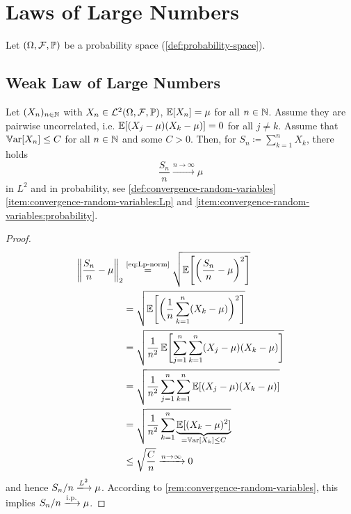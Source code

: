 \pagebreak

\section{Laws of Large Numbers}

Let $(\Omega,\mathcal{F},\mathbb{P})$ be a probability space (\autoref{def:probability-space}).

\subsection{Weak Law of Large Numbers}

\begin{theorem}\label{thm:weak-law-of-large-numbers}
Let $(X_n)_{n \in \mathbb{N}}$ with $X_n \in \mathcal{L}^2(\Omega,\mathcal{F},\mathbb{P})$, $\operatorname{\mathbb{E}}[X_n]=\mu$ for all $n \in \mathbb{N}$.
Assume they are pairwise uncorrelated, i.e. $\operatorname{\mathbb{E}}[(X_j-\mu)(X_k-\mu)]=0$ for all $j \neq k$.
Assume that $\operatorname{\mathbb{V}ar}[X_n] \leq C$ for all $n \in \mathbb{N}$ and some $C > 0$.
Then, for $S_n \coloneq \sum_{k=1}^n X_k$, there holds
\[
\frac{S_n}{n}
\xrightarrow{n \to \infty}
\mu
\]
in $L^2$ and %
in probability, see \autoref{def:convergence-random-variables} \ref{item:convergence-random-variables:Lp} and \ref{item:convergence-random-variables:probability}.
\end{theorem}
\begin{proof}
\[
\begin{aligned}
\left\|\frac{S_n}{n}-\mu\right\|_2
&\overset{\text{\eqref{eq:Lp-norm}}}{=}
\sqrt{
\operatorname{\mathbb{E}}\Biggl[\biggl(\frac{S_n}{n}-\mu\biggr)^2\Biggr]
} \\
&=
\sqrt{
\operatorname{\mathbb{E}}\Biggl[\biggl(\frac{1}{n}\sum_{k=1}^n (X_k-\mu)\biggr)^2\Biggr]
} \\
&=
\sqrt{
\frac{1}{n^2}
\operatorname{\mathbb{E}}\Biggl[\sum_{j=1}^n\sum_{k=1}^n (X_j-\mu)(X_k-\mu)\Biggr]
} \\
&=
\sqrt{
\frac{1}{n^2}
\sum_{j=1}^n\sum_{k=1}^n
\operatorname{\mathbb{E}}[(X_j-\mu)(X_k-\mu)]
}
\\
&=
\sqrt{
\frac{1}{n^2}
\sum_{k=1}^n \underbrace{\operatorname{\mathbb{E}}[(X_k-\mu)^2]}_{\smash{=\operatorname{\mathbb{V}ar}[X_k] \leq C}}
}
\\
&\leq
\sqrt{\frac{C}{n}}
\xrightarrow{n\to\infty}
0
\end{aligned}
\]
and hence $S_n/n \xlongrightarrow{L^2} \mu$. %
According to \autoref{rem:convergence-random-variables}, this implies $S_n/n \xlongrightarrow{\text{i.p.}} \mu$.
\end{proof}

